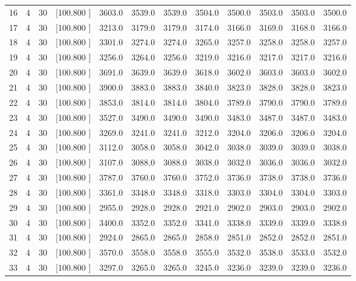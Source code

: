 \documentclass[12pt,a4paper]{article}
\begin{document}
\begin{center}
{\begin{tabular}{r r r r r r r r r r r r}
  16&  4& 30&[100.800   ]&  3603.0&  3539.0&  3539.0&  3504.0&  3500.0&  3503.0&  3503.0&  3500.0\\[-0.02in]
  17&  4& 30&[100.800   ]&  3213.0&  3179.0&  3179.0&  3174.0&  3166.0&  3169.0&  3168.0&  3166.0\\[-0.02in]
  18&  4& 30&[100.800   ]&  3301.0&  3274.0&  3274.0&  3265.0&  3257.0&  3258.0&  3258.0&  3257.0\\[-0.02in]
  19&  4& 30&[100.800   ]&  3256.0&  3264.0&  3256.0&  3219.0&  3216.0&  3217.0&  3217.0&  3216.0\\[-0.02in]
  20&  4& 30&[100.800   ]&  3691.0&  3639.0&  3639.0&  3618.0&  3602.0&  3603.0&  3603.0&  3602.0\\[-0.02in]
  21&  4& 30&[100.800   ]&  3900.0&  3883.0&  3883.0&  3840.0&  3823.0&  3828.0&  3828.0&  3823.0\\[-0.02in]
  22&  4& 30&[100.800   ]&  3853.0&  3814.0&  3814.0&  3804.0&  3789.0&  3790.0&  3790.0&  3789.0\\[-0.02in]
  23&  4& 30&[100.800   ]&  3527.0&  3490.0&  3490.0&  3490.0&  3483.0&  3487.0&  3487.0&  3483.0\\[-0.02in]
  24&  4& 30&[100.800   ]&  3269.0&  3241.0&  3241.0&  3212.0&  3204.0&  3206.0&  3206.0&  3204.0\\[-0.02in]
  25&  4& 30&[100.800   ]&  3112.0&  3058.0&  3058.0&  3042.0&  3038.0&  3039.0&  3039.0&  3038.0\\[-0.02in]
  26&  4& 30&[100.800   ]&  3107.0&  3088.0&  3088.0&  3038.0&  3032.0&  3036.0&  3036.0&  3032.0\\[-0.02in]
  27&  4& 30&[100.800   ]&  3787.0&  3760.0&  3760.0&  3752.0&  3736.0&  3738.0&  3738.0&  3736.0\\[-0.02in]
  28&  4& 30&[100.800   ]&  3361.0&  3348.0&  3348.0&  3318.0&  3303.0&  3304.0&  3304.0&  3303.0\\[-0.02in]
  29&  4& 30&[100.800   ]&  2955.0&  2928.0&  2928.0&  2921.0&  2902.0&  2903.0&  2903.0&  2902.0\\[-0.02in]
  30&  4& 30&[100.800   ]&  3400.0&  3352.0&  3352.0&  3341.0&  3338.0&  3339.0&  3339.0&  3338.0\\[-0.02in]
  31&  4& 30&[100.800   ]&  2924.0&  2865.0&  2865.0&  2858.0&  2851.0&  2852.0&  2852.0&  2851.0\\[-0.02in]
  32&  4& 30&[100.800   ]&  3570.0&  3558.0&  3558.0&  3555.0&  3532.0&  3538.0&  3533.0&  3532.0\\[-0.02in]
  33&  4& 30&[100.800   ]&  3297.0&  3265.0&  3265.0&  3245.0&  3236.0&  3239.0&  3239.0&  3236.0\\[-0.02in]

\end{tabular}}
\end{center}
\end{document}

